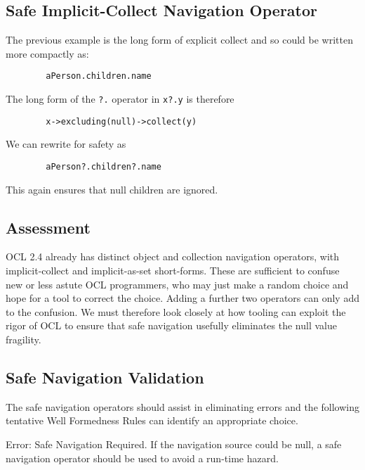 \documentclass{llncs}
\begin{document}
\subsection{Safe Implicit-Collect Navigation Operator}

The previous example is the long form of explicit collect and so could be written more compactly as: 

\begin{verbatim}
        aPerson.children.name
\end{verbatim}

The long form of the \verb|?.| operator in  \verb|x?.y| is therefore

\begin{verbatim}
        x->excluding(null)->collect(y)
\end{verbatim}

We can rewrite for safety as

\begin{verbatim}
        aPerson?.children?.name
\end{verbatim}

This again ensures that null children are ignored.

\subsection{Assessment}

OCL 2.4 already has distinct object and collection navigation operators, with implicit-collect and implicit-as-set short-forms. These are sufficient to confuse new or less astute OCL programmers, who may just make a random choice and hope for a tool to correct the choice. Adding a further two operators can only add to the confusion. We must therefore look closely at how tooling can exploit the rigor of OCL to ensure that safe navigation usefully eliminates the null value fragility.

\subsection{Safe Navigation Validation}

The safe navigation operators should assist in eliminating errors and the following tentative Well Formedness Rules can identify an appropriate choice.

Error: Safe Navigation Required. If the navigation source could be null, a safe navigation operator should be used to avoid a run-time hazard.
\end{document}

